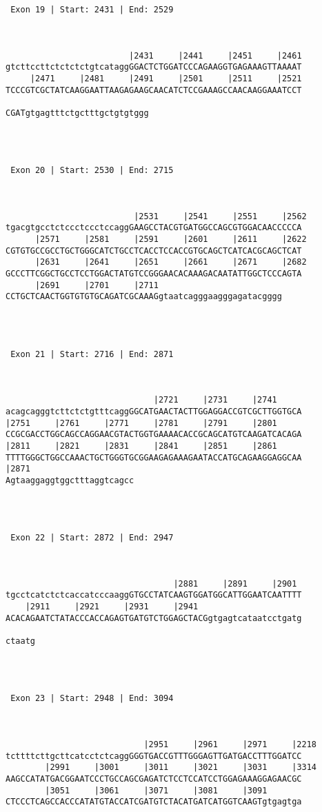 \documentclass{article}
\begin{document}
\begin{Verbatim}
 Exon 19 | Start: 2431 | End: 2529 



                         |2431     |2441     |2451     |2461
gtcttccttctctctctgtcataggGGACTCTGGATCCCAGAAGGTGAGAAAGTTAAAAT
     |2471     |2481     |2491     |2501     |2511     |2521
TCCCGTCGCTATCAAGGAATTAAGAGAAGCAACATCTCCGAAAGCCAACAAGGAAATCCT
                             
CGATgtgagtttctgctttgctgtgtggg




 Exon 20 | Start: 2530 | End: 2715 



                          |2531     |2541     |2551     |2562
tgacgtgcctctccctccctccaggGAAGCCTACGTGATGGCCAGCGTGGACAACCCCCA
      |2571     |2581     |2591     |2601     |2611     |2622
CGTGTGCCGCCTGCTGGGCATCTGCCTCACCTCCACCGTGCAGCTCATCACGCAGCTCAT
      |2631     |2641     |2651     |2661     |2671     |2682
GCCCTTCGGCTGCCTCCTGGACTATGTCCGGGAACACAAAGACAATATTGGCTCCCAGTA
      |2691     |2701     |2711                         
CCTGCTCAACTGGTGTGTGCAGATCGCAAAGgtaatcagggaagggagatacgggg




 Exon 21 | Start: 2716 | End: 2871 



                              |2721     |2731     |2741     
acagcagggtcttctctgtttcaggGGCATGAACTACTTGGAGGACCGTCGCTTGGTGCA
|2751     |2761     |2771     |2781     |2791     |2801     
CCGCGACCTGGCAGCCAGGAACGTACTGGTGAAAACACCGCAGCATGTCAAGATCACAGA
|2811     |2821     |2831     |2841     |2851     |2861     
TTTTGGGCTGGCCAAACTGCTGGGTGCGGAAGAGAAAGAATACCATGCAGAAGGAGGCAA
|2871                     
Agtaaggaggtggctttaggtcagcc




 Exon 22 | Start: 2872 | End: 2947 



                                  |2881     |2891     |2901 
tgcctcatctctcaccatcccaaggGTGCCTATCAAGTGGATGGCATTGGAATCAATTTT
    |2911     |2921     |2931     |2941                     
ACACAGAATCTATACCCACCAGAGTGATGTCTGGAGCTACGgtgagtcataatcctgatg
      
ctaatg




 Exon 23 | Start: 2948 | End: 3094 



                            |2951     |2961     |2971     |2218
tcttttcttgcttcatcctctcaggGGGTGACCGTTTGGGAGTTGATGACCTTTGGATCC
        |2991     |3001     |3011     |3021     |3031     |3314
AAGCCATATGACGGAATCCCTGCCAGCGAGATCTCCTCCATCCTGGAGAAAGGAGAACGC
        |3051     |3061     |3071     |3081     |3091       
CTCCCTCAGCCACCCATATGTACCATCGATGTCTACATGATCATGGTCAAGTgtgagtga
                 

\end{Verbatim}
\end{document}
